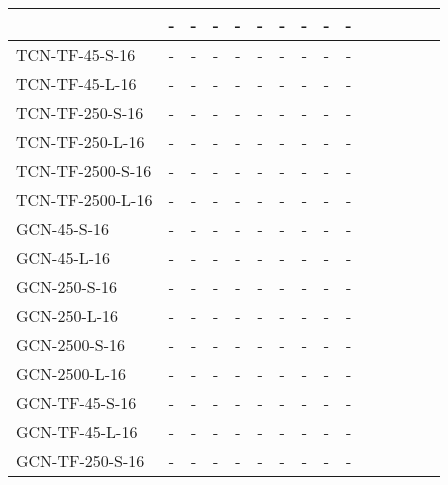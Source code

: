 \begin{table*}[h]
\begin{tabular}{lcccccccccccccc}
            & - & - & - & - & - & - & - & - & - \\
        \midrule
        TCN-TF-45-S-16               
            & - & - & - & - & - & - & - & - & - \\
        TCN-TF-45-L-16               
            & - & - & - & - & - & - & - & - & - \\
        TCN-TF-250-S-16               
            & - & - & - & - & - & - & - & - & - \\
        TCN-TF-250-L-16               
            & - & - & - & - & - & - & - & - & - \\
        TCN-TF-2500-S-16               
            & - & - & - & - & - & - & - & - & - \\
        TCN-TF-2500-L-16               
            & - & - & - & - & - & - & - & - & - \\
        \midrule
        GCN-45-S-16               
            & - & - & - & - & - & - & - & - & - \\ 
        GCN-45-L-16               
            & - & - & - & - & - & - & - & - & - \\
        GCN-250-S-16               
            & - & - & - & - & - & - & - & - & - \\ 
        GCN-250-L-16               
            & - & - & - & - & - & - & - & - & - \\
        GCN-2500-S-16               
            & - & - & - & - & - & - & - & - & - \\ 
        GCN-2500-L-16               
            & - & - & - & - & - & - & - & - & - \\
        \midrule
        GCN-TF-45-S-16               
            & - & - & - & - & - & - & - & - & - \\
        GCN-TF-45-L-16               
            & - & - & - & - & - & - & - & - & - \\
        GCN-TF-250-S-16               
            & - & - & - & - & - & - & - & - & - \\

\end{tabular}
\end{table*}
